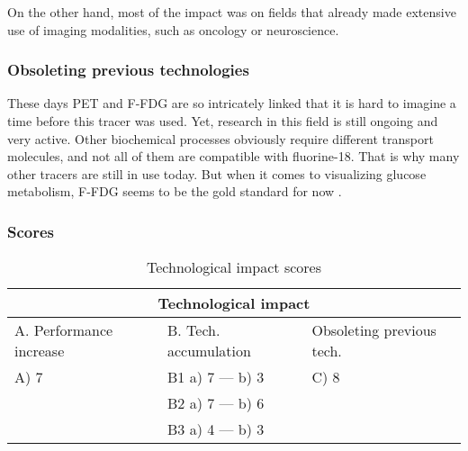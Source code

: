 On the other hand, most of the impact was on fields that already made extensive
use of imaging modalities, such as oncology or neuroscience.

\subsubsection{Obsoleting previous technologies}
These days PET and F-FDG are so intricately linked that it is hard to imagine a
time before this tracer was used. Yet, research in this field is still ongoing
and very active. Other biochemical processes obviously require different
transport molecules, and not all of them are compatible with fluorine-18. That
is why many other tracers are still in use today. But when it comes to
visualizing glucose metabolism, F-FDG seems to be the gold standard for now
\cite{radiopharma}.

\subsubsection{Scores}
\begin{table}[h]
\centering
\begin{tabular}{l l l}
\hline
\multicolumn{3}{|c|}{Technological impact} \\
\hline
A. Performance increase & B. Tech. accumulation & Obsoleting previous tech.\\
A) 7 & B1 a) 7 --- b) 3 & C) 8\\ 
     & B2 a) 7 --- b) 6 & \\
     & B3 a) 4 --- b) 3 & \\
\hline
\end{tabular}
\caption{Technological impact scores}
\label{tbl:impactscores4}
\end{table}